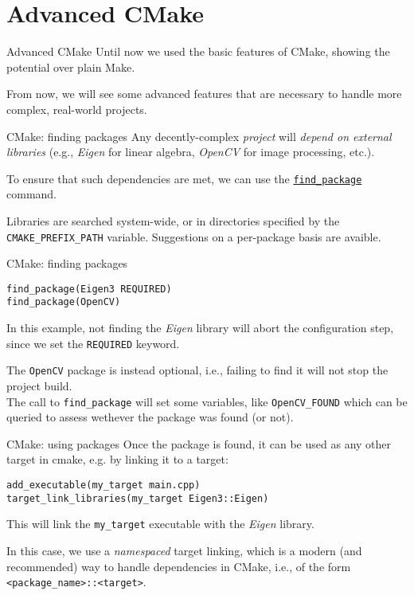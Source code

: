 \section{Advanced CMake}
\begin{frame}{Advanced CMake}
    Until now we used the basic features of CMake, showing the potential over plain Make.

From now, we will see some advanced features that are necessary to handle more complex, real-world projects.
\end{frame}

\begin{frame}[fragile]{CMake: finding packages}
    Any decently-complex \emph{project} will \emph{depend on external libraries} (e.g., \textit{Eigen} for linear algebra, \textit{OpenCV} for image processing, etc.).

    To ensure that such dependencies are met, we can use the \href{https://cmake.org/cmake/help/latest/command/find_package.html}{\texttt{find\_package}} command.

    Libraries are searched system-wide, or in directories specified by the \texttt{CMAKE\_PREFIX\_PATH} variable. Suggestions on a per-package basis are avaible.
\end{frame}

\begin{frame}[fragile]{CMake: finding packages}
\begin{lstlisting}
find_package(Eigen3 REQUIRED)
find_package(OpenCV)
\end{lstlisting}
    
    In this example, not finding the \textit{Eigen} library will abort the configuration step, since we set the \texttt{REQUIRED} keyword.

    The \texttt{OpenCV} package is instead optional, i.e., failing to find it will not stop the project build. \\
    The call to \texttt{find\_package} will set some variables, like \texttt{OpenCV\_FOUND} which can be queried to assess wethever the package was found (or not).
\end{frame}

\begin{frame}[fragile]{CMake: using packages}
    Once the package is found, it can be used as any other target in cmake, e.g. by linking it to a target:
\begin{lstlisting}
add_executable(my_target main.cpp)
target_link_libraries(my_target Eigen3::Eigen)
\end{lstlisting}
    This will link the \texttt{my\_target} executable with the \textit{Eigen} library.
    
    In this case, we use a \textit{namespaced} target linking, which is a modern (and recommended) way to handle dependencies in CMake, i.e., of the form \texttt{<package\_name>::<target>}.
\end{frame}

